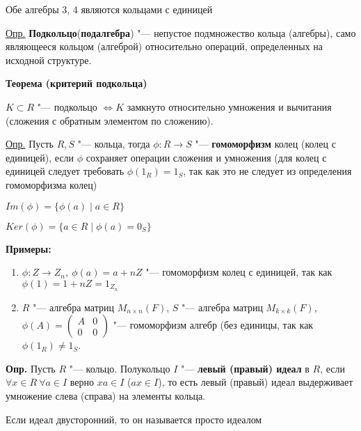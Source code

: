 \documentclass{article}
\begin{document}
Обе алгебры 3, 4 являются кольцами с единицей

\vspace{5pt}

\underline{Опр.} \textbf{Подкольцо}(\textbf{подалгебра}) "--- непустое подмножество кольца (алгебры), само являющееся кольцом (алгеброй) относительно операций, определенных на исходной структуре.

\vspace{10pt}

\textbf{Теорема (критерий подкольца)}

$K \subset R$ "--- подкольцо $\Leftrightarrow K$ замкнуто относительно умножения и вычитания (сложения с обратным элементом по сложению).

\vspace{5pt}

\underline{Опр.} Пусть $R, S$ "--- кольца, тогда $\phi: R \rightarrow S$ "--- \textbf{гомоморфизм} колец (колец с единицей), если $\phi$ сохраняет операции сложения и умножения (для колец с единицей следует требовать $\phi(1_R) = 1_S$, так как это не следует из определения гомоморфизма колец)

$Im(\phi) = \{\phi(a) \mid a \in R\}$

$Ker(\phi) = \{a \in R \mid \phi(a) = 0_S\}$

\vspace{5pt}

\textbf{Примеры:}
\begin{enumerate}
	\item $\phi: Z \rightarrow Z_n, \ \phi(a) = a + nZ$ "--- гомоморфизм колец с единицей, так как $\phi(1) = 1 + nZ = 1_{Z_n}$
	\item $R$ "--- алгебра матриц $M_{n \times n}(F)$, $S$ "--- алгебра матриц $M_{k \times k}(F)$, $\phi(A) = \begin{pmatrix} 
	A & 0 \\
	0 & 0 \end{pmatrix}$ "--- гомоморфизм алгебр (без единицы, так как $\phi(1_R) \neq 1_S$.
\end{enumerate} 

\vspace{5pt}

\textbf{Опр.} Пусть $R$ "--- кольцо. Полукольцо $I$ "--- \textbf{левый (правый) идеал} в $R$, если $\forall x \in R \ \forall a \in I$ верно $xa \in I$ ($ax \in I$), то есть левый (правый) идеал выдерживает умножение слева (справа) на элементы кольца.

Если идеал двусторонний, то он называется просто идеалом
\end{document}
